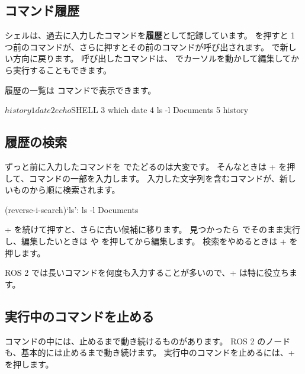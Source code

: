 \begin{terminal}[コマンドの基本形]
\subsection{コマンド履歴}

シェルは、過去に入力したコマンドを\textbf{履歴}として記録しています。
\key{\(\uparrow\)} を押すと 1 つ前のコマンドが、さらに押すとその前のコマンドが呼び出されます。
\key{\(\downarrow\)} で新しい方向に戻ります。
呼び出したコマンドは、\key{\(\leftarrow\)} \key{\(\rightarrow\)} でカーソルを動かして編集してから実行することもできます。

履歴の一覧は  コマンドで表示できます。

\begin{terminal}[コマンド履歴を表示する]
$ history
    1  date
    2  echo $SHELL
    3  which date
    4  ls -l Documents
    5  history
\end{terminal}

\subsection{履歴の検索}

ずっと前に入力したコマンドを \key{\(\uparrow\)} でたどるのは大変です。
そんなときは + を押して、コマンドの一部を入力します。
入力した文字列を含むコマンドが、新しいものから順に検索されます。

\begin{terminal}
(reverse-i-search)`ls': ls -l Documents
\end{terminal}

+ を続けて押すと、さらに古い候補に移ります。
見つかったら  でそのまま実行し、編集したいときは \key{\(\leftarrow\)} や \key{\(\rightarrow\)} を押してから編集します。
検索をやめるときは + を押します。

ROS 2 では長いコマンドを何度も入力することが多いので、+ は特に役立ちます。

\subsection{実行中のコマンドを止める}

コマンドの中には、止めるまで動き続けるものがあります。
ROS 2 のノードも、基本的には止めるまで動き続けます。
実行中のコマンドを止めるには、+ を押します。



\end{terminal}
